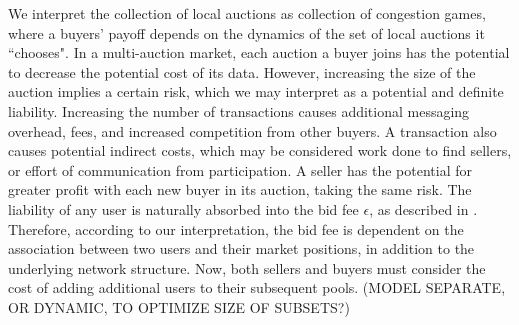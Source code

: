 \documentclass[sigconf, anonymous]{acmart}
\theoremstyle{definition}
\begin{document}
We interpret the collection of local auctions as collection of congestion games,
where a buyers' payoff depends on the dynamics of the set of local auctions it
``chooses".
In a multi-auction market, each auction a buyer joins has the potential to
decrease the potential cost of its data. However, increasing the size of the
auction implies a certain risk, which we may interpret as a potential and
definite
liability. Increasing the number of transactions causes additional messaging
overhead, fees, and increased competition from other buyers. 
A transaction also causes potential indirect costs, which may be considered work done to find
sellers, or effort of communication from participation. A seller
has the potential for greater profit with each new buyer in its auction, taking 
the same risk.
The liability of any user is naturally absorbed into the bid fee $\epsilon$,
as described in \cite{semret}. Therefore, according to our interpretation, the bid fee is
dependent on the association between two users and their market positions, in
addition to the underlying network structure. Now, both sellers and buyers must consider
the cost of adding additional users to their subsequent pools. (MODEL SEPARATE,
OR DYNAMIC, TO OPTIMIZE SIZE OF SUBSETS?)
\end{document}
